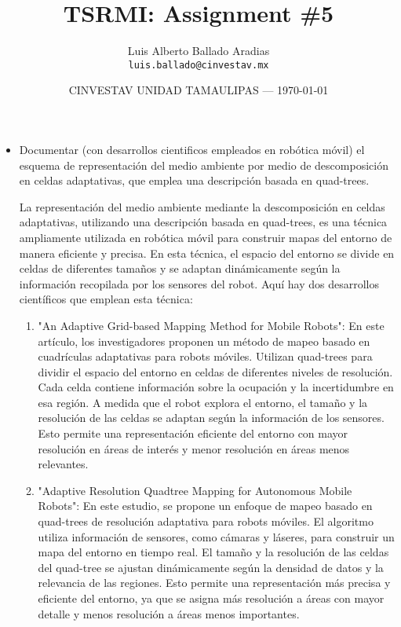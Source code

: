 \documentclass{article}
\title{TSRMI: Assignment \#5} %
\author{Luis Alberto Ballado Aradias\\ \texttt{luis.ballado@cinvestav.mx}} %
\date{CINVESTAV UNIDAD TAMAULIPAS --- \today} %
\begin{document}
\maketitle %


\begin{itemize} %
\item Documentar (con desarrollos cientificos empleados en robótica móvil) el esquema de representación del medio ambiente por medio de descomposición en celdas adaptativas, que emplea una descripción basada en quad-trees.

  La representación del medio ambiente mediante la descomposición en celdas adaptativas, utilizando una descripción basada en quad-trees, es una técnica ampliamente utilizada en robótica móvil para construir mapas del entorno de manera eficiente y precisa. En esta técnica, el espacio del entorno se divide en celdas de diferentes tamaños y se adaptan dinámicamente según la información recopilada por los sensores del robot. Aquí hay dos desarrollos científicos que emplean esta técnica:

  \begin{enumerate}
  \item "An Adaptive Grid-based Mapping Method for Mobile Robots": En este artículo, los investigadores proponen un método de mapeo basado en cuadrículas adaptativas para robots móviles. Utilizan quad-trees para dividir el espacio del entorno en celdas de diferentes niveles de resolución. Cada celda contiene información sobre la ocupación y la incertidumbre en esa región. A medida que el robot explora el entorno, el tamaño y la resolución de las celdas se adaptan según la información de los sensores. Esto permite una representación eficiente del entorno con mayor resolución en áreas de interés y menor resolución en áreas menos relevantes.
  \item "Adaptive Resolution Quadtree Mapping for Autonomous Mobile Robots": En este estudio, se propone un enfoque de mapeo basado en quad-trees de resolución adaptativa para robots móviles. El algoritmo utiliza información de sensores, como cámaras y láseres, para construir un mapa del entorno en tiempo real. El tamaño y la resolución de las celdas del quad-tree se ajustan dinámicamente según la densidad de datos y la relevancia de las regiones. Esto permite una representación más precisa y eficiente del entorno, ya que se asigna más resolución a áreas con mayor detalle y menos resolución a áreas menos importantes.
    

\end{enumerate}
\end{itemize}
\end{document}
